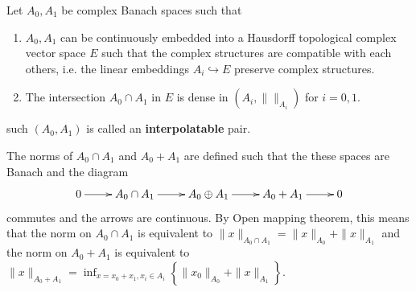 Let \(A_0, A_1\) be complex Banach spaces such that 
\begin{enumerate}
\item \(A_0, A_1\) can be continuously embedded into a Hausdorff topological complex vector
space \(E\) such that the complex structures are compatible with each others,
i.e. the linear embeddings \(A_i \hookrightarrow E\) preserve complex structures.
\item The intersection \(A_0\cap A_1\) in \(E\) is dense in \((A_i,\|\|_{A_i})\) for \(i=0,1\).
\end{enumerate}
such \((A_0,A_1)\) is called an \textbf{interpolatable} pair.

The norms of \(A_0\cap A_1\) and \(A_0 + A_1\) are defined such that the these spaces
are Banach and the diagram
\begin{equation}
\label{fig:interpol-pair}
\xymatrix{
0 \ar@{->}[r] & A_0\cap A_1 \ar@{->}[r] & A_0\oplus A_1 \ar@{->}[r] & A_0+A_1 \ar@{->}[r] & 0
}
\end{equation}
commutes and the arrows are
continuous. By Open mapping theorem, this means that the norm on \(A_0\cap A_1\) is
equivalent to \(\|x\|_{A_0\cap A_1} = \|x\|_{A_0} + \|x\|_{A_1}\) and the norm on \(A_0+A_1\) is equivalent to \(\|x\|_{A_0+ A_1} = \inf_{x=x_0 + x_1, x_i\in A_i} \left\{\|x_0\|_{A_0} + \|x\|_{A_1}\right\}\).

